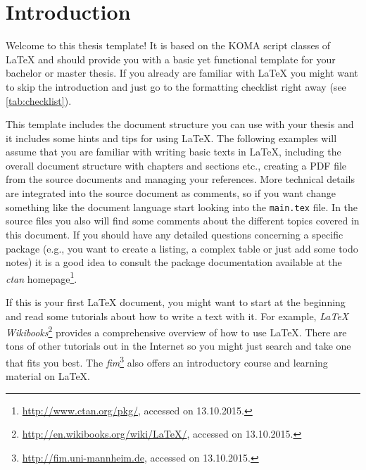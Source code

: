 \chapter{Introduction}
\label{chap:introduction}
Welcome to this thesis template!
It is based on the KOMA script classes of \LaTeX{} and should provide you with a basic yet functional template for your bachelor or master thesis.
If you already are familiar with \LaTeX{} you might want to skip the introduction and just go to the formatting checklist right away (see \cref{tab:checklist}).

This template includes the document structure you can use with your thesis and it includes some hints and tips for using \LaTeX{}.
The following examples will assume that you are familiar with writing basic texts in \LaTeX{}, including the overall document structure with chapters and sections etc., creating a PDF file from the source documents and managing your references.
More technical details are integrated into the source document as comments, so if you want change something like the document language start looking into the \texttt{main.tex} file.
In the source files you also will find some comments about the different topics covered in this document.
If you should have any detailed questions concerning a specific package (e.g., you want to create a listing, a complex table or just add some todo notes) it is a good idea to consult the package documentation available at the \emph{\gls{ctan}} homepage\footnote{\url{http://www.ctan.org/pkg/}, accessed on 13.10.2015.}.

If this is your first \LaTeX{} document, you might want to start at the beginning and read some tutorials about how to write a text with it.
For example, \emph{LaTeX Wikibooks}\footnote{\url{http://en.wikibooks.org/wiki/LaTeX/}, accessed on 13.10.2015.} provides a comprehensive overview of how to use \LaTeX{}.
There are tons of other tutorials out in the Internet so you might just search and take one that fits you best.
The \emph{\gls{fim}}\footnote{\url{http://fim.uni-mannheim.de}, accessed on 13.10.2015.} also offers an introductory course and learning material on \LaTeX{}.


